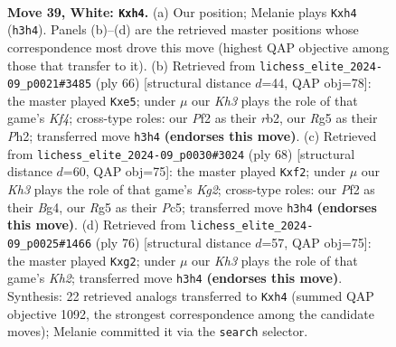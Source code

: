 \documentclass[11pt]{article}
\begin{document}
\clearpage

\begin{figure}[p]\centering
\begin{subfigure}{0.46\textwidth}\centering
\resizebox{\linewidth}{!}{%
\newchessgame
\chessboard[
  setfen={7k/p2p4/2p2p2/6R1/1P1P3q/7K/5P1P/6r1 w - - 0 39},
  showmover=false,
  pgfstyle=straightmove, color=movearrow, markmove={h3-h4}
]}
\caption{}
\end{subfigure}\hfill
\begin{subfigure}{0.46\textwidth}\centering
\resizebox{\linewidth}{!}{%
\newchessgame
\chessboard[
  setfen={6k1/p4p2/8/4qR2/5K1p/1PP2P2/1r5P/8 w - - 0 34},
  showmover=false,
  pgfstyle=straightmove, color=movearrow, markmove={f4-e5}
]}
\caption{}
\end{subfigure}
\\[4pt]
\begin{subfigure}{0.46\textwidth}\centering
\resizebox{\linewidth}{!}{%
\newchessgame
\chessboard[
  setfen={5k2/p5p1/1p2p3/2PpP3/6B1/2P5/5qKP/8 w - - 0 35},
  showmover=false,
  pgfstyle=straightmove, color=movearrow, markmove={g2-f2}
]}
\caption{}
\end{subfigure}\hfill
\begin{subfigure}{0.46\textwidth}\centering
\resizebox{\linewidth}{!}{%
\newchessgame
\chessboard[
  setfen={6k1/1p3p2/8/1R1p4/p7/P3Pr1P/1P4qK/8 w - - 0 39},
  showmover=false,
  pgfstyle=straightmove, color=movearrow, markmove={h2-g2}
]}
\caption{}
\end{subfigure}
\caption{\textbf{Move 39, White: \texttt{Kxh4}.} (a) Our position; Melanie plays \texttt{Kxh4} (\texttt{h3h4}). Panels (b)--(d) are the retrieved master positions whose correspondence most drove this move (highest QAP objective among those that transfer to it). (b) Retrieved from \texttt{lichess\_elite\_2024-09\_p0021\#3485} (ply 66) [structural distance $d$=44, QAP obj=78]: the master played \texttt{Kxe5}; under $\mu$ our \emph{Kh3} plays the role of that game's \emph{Kf4}; cross-type roles: our \emph{P}f2 as their \emph{r}b2, our \emph{R}g5 as their \emph{P}h2; transferred move \texttt{h3h4} \textbf{(endorses this move)}. (c) Retrieved from \texttt{lichess\_elite\_2024-09\_p0030\#3024} (ply 68) [structural distance $d$=60, QAP obj=75]: the master played \texttt{Kxf2}; under $\mu$ our \emph{Kh3} plays the role of that game's \emph{Kg2}; cross-type roles: our \emph{P}f2 as their \emph{B}g4, our \emph{R}g5 as their \emph{P}c5; transferred move \texttt{h3h4} \textbf{(endorses this move)}. (d) Retrieved from \texttt{lichess\_elite\_2024-09\_p0025\#1466} (ply 76) [structural distance $d$=57, QAP obj=75]: the master played \texttt{Kxg2}; under $\mu$ our \emph{Kh3} plays the role of that game's \emph{Kh2}; transferred move \texttt{h3h4} \textbf{(endorses this move)}. Synthesis: 22 retrieved analogs transferred to \texttt{Kxh4} (summed QAP objective 1092, the strongest correspondence among the candidate moves); Melanie committed it via the \texttt{search} selector.}
\label{fig:thought-m76}
\end{figure}
\end{document}
